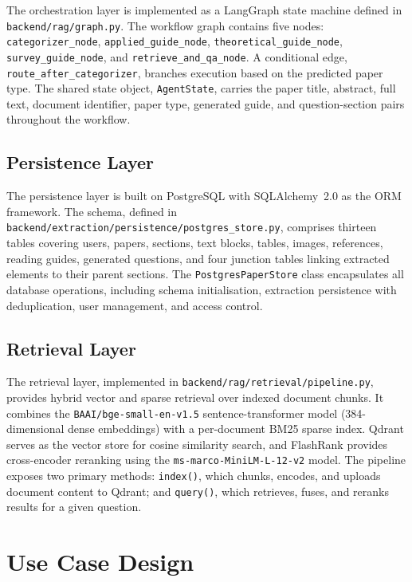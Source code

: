 \documentclass[12pt,a4paper]{report}
\begin{document}
The orchestration layer is implemented as a LangGraph state machine defined in
\texttt{backend/rag/graph.py}. The workflow graph contains five nodes:
\texttt{categorizer\_node}, \texttt{applied\_guide\_node},
\texttt{theoretical\_guide\_node}, \texttt{survey\_guide\_node}, and
\texttt{retrieve\_and\_qa\_node}. A conditional edge,
\texttt{route\_after\_categorizer}, branches execution based on the predicted
paper type. The shared state object, \texttt{AgentState}, carries the paper
title, abstract, full text, document identifier, paper type, generated guide,
and question-section pairs throughout the workflow.

\subsection{Persistence Layer}

The persistence layer is built on PostgreSQL with SQLAlchemy~2.0 as the ORM
framework. The schema, defined in
\texttt{backend/extraction/persistence/postgres\_store.py}, comprises thirteen
tables covering users, papers, sections, text blocks, tables, images,
references, reading guides, generated questions, and four junction tables
linking extracted elements to their parent sections. The
\texttt{PostgresPaperStore} class encapsulates all database operations,
including schema initialisation, extraction persistence with deduplication,
user management, and access control.

\subsection{Retrieval Layer}

The retrieval layer, implemented in
\texttt{backend/rag/retrieval/pipeline.py}, provides hybrid vector and sparse
retrieval over indexed document chunks. It combines the
\texttt{BAAI/bge-small-en-v1.5} sentence-transformer model (384-dimensional
dense embeddings) with a per-document BM25 sparse index. Qdrant serves as the
vector store for cosine similarity search, and FlashRank provides
cross-encoder reranking using the \texttt{ms-marco-MiniLM-L-12-v2} model.
The pipeline exposes two primary methods: \texttt{index()}, which chunks,
encodes, and uploads document content to Qdrant; and \texttt{query()}, which
retrieves, fuses, and reranks results for a given question.

\section{Use Case Design}
\end{document}
